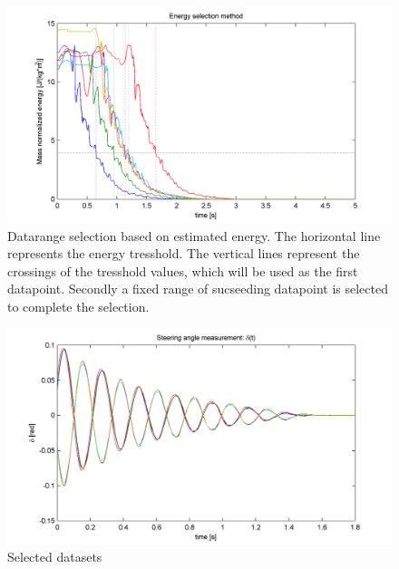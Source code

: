 		\begin{figure}
			\centering
				\includegraphics{images/energysel}
				\caption{Datarange selection based on estimated energy. The horizontal line represents the energy tresshold. The vertical lines represent the crossings of the tresshold values, which will be used as the first datapoint. Secondly a fixed range of sucseeding datapoint is selected to complete the selection.}
				\label{fig:energysel}
		\end{figure}
		\begin{figure}
			\centering
				\includegraphics{images/deltasel}
				\caption{Selected datasets}
				\label{fig:deltasel}
		\end{figure}
